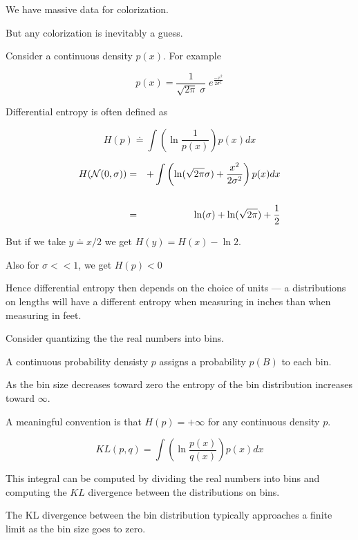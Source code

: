 {\vfill
We have massive data for colorization.

\vfill
But any colorization is inevitably a guess.


Consider a continuous density $p(x)$.  For example

\vfill
$$p(x) = \frac{1}{\sqrt{2\pi}\; \sigma}\; e^{\frac{-x^2}{2\sigma^2}}$$

\vfill
Differential entropy is often defined as

\vfill
$$H(p) \doteq \int \left(\ln \frac{1}{p(x)}\right) p(x) dx$$


\begin{eqnarray*}
  H({\cal N}(0,\sigma)) & = &  + \int \left( \ln(\sqrt{2\pi} \sigma) + \frac{x^2}{2\sigma^2}\right) p(x) dx \\
  \\
  & = & \ln(\sigma) + \ln(\sqrt{2\pi}) + \frac{1}{2}
\end{eqnarray*}

\vfill
But if we take $y \doteq x/2$ we get $H(y) = H(x) - \ln 2$.

\vfill
Also for $\sigma << 1$, we get $H(p) < 0$

\vfill
Hence differential entropy then depends on the choice of units --- a distributions on lengths will have a different entropy
when measuring in inches than when measuring in feet.


Consider quantizing the the real numbers into bins.

\vfill
A continuous probability densisty $p$ assigns a probability $p(B)$ to each bin.

\vfill
As the bin size decreases toward zero the entropy of the bin distribution increases toward $\infty$.

\vfill
A meaningful convention is that $H(p) = +\infty$ for any continuous density $p$.


$$KL(p,q) = \int \left( \ln \frac{p(x)}{q(x)}\right) p(x) dx$$

\vfill
This integral can be computed by dividing the real numbers into bins and computing the $KL$ divergence between the distributions on bins.

\vfill
The KL divergence between the bin distribution typically approaches a finite limit as the bin size goes to zero.

}

